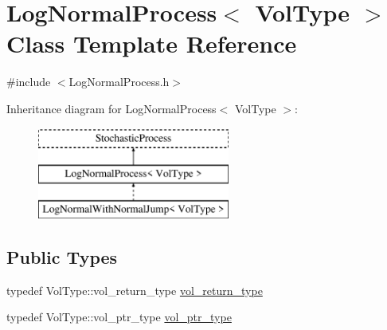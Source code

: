 \hypertarget{class_log_normal_process}{}\section{Log\+Normal\+Process$<$ Vol\+Type $>$ Class Template Reference}
\label{class_log_normal_process}


{\ttfamily \#include $<$Log\+Normal\+Process.\+h$>$}

Inheritance diagram for Log\+Normal\+Process$<$ Vol\+Type $>$\+:\begin{figure}[H]
\begin{center}
\leavevmode
\includegraphics[height=3.000000cm]{class_log_normal_process}
\end{center}
\end{figure}
\subsection*{Public Types}
\begin{DoxyCompactItemize}
\item 
typedef Vol\+Type\+::vol\+\_\+return\+\_\+type \hyperlink{class_log_normal_process_a160d9cd152962a42ac9fc016d0948c1c}{vol\+\_\+return\+\_\+type}
\item 
typedef Vol\+Type\+::vol\+\_\+ptr\+\_\+type \hyperlink{class_log_normal_process_a904926553c5e4d60e52caf87e1745651}{vol\+\_\+ptr\+\_\+type}
\end{DoxyCompactItemize}
